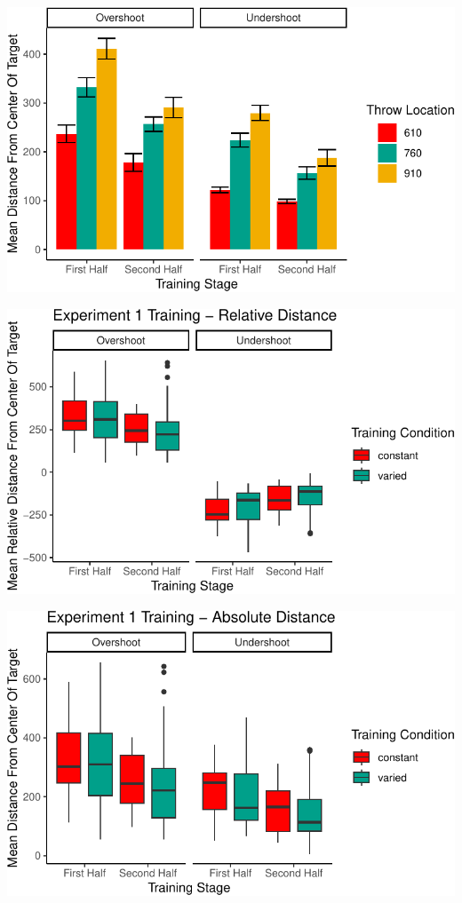 \documentclass[
  12pt,
  letterpaper,
]{article}
\begin{document}
\includegraphics{full_files/figure-pdf/unnamed-chunk-63-2.pdf}

\includegraphics{full_files/figure-pdf/unnamed-chunk-63-3.pdf}

\includegraphics{full_files/figure-pdf/unnamed-chunk-63-4.pdf}
\end{document}
